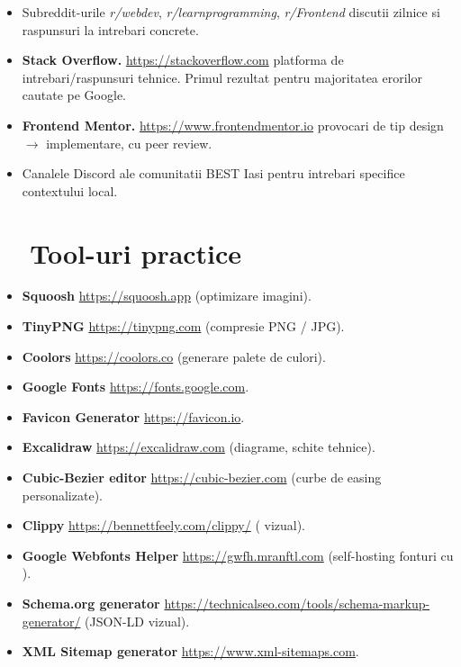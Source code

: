 \begin{itemize}[itemsep=2pt]
  \item Subreddit-urile \emph{r/webdev}, \emph{r/learnprogramming}, \emph{r/Frontend} \textendash{} discutii zilnice si raspunsuri la intrebari concrete.
  \item \textbf{Stack Overflow.} \url{https://stackoverflow.com} \textendash{} platforma de intrebari/raspunsuri tehnice. Primul rezultat pentru majoritatea erorilor cautate pe Google.
  \item \textbf{Frontend Mentor.} \url{https://www.frontendmentor.io} \textendash{} provocari de tip design $\to$ implementare, cu peer review.
  \item Canalele Discord ale comunitatii BEST Iasi \textendash{} pentru intrebari specifice contextului local.
\end{itemize}

\section{\faTools\ \ Tool-uri practice}

\begin{itemize}[itemsep=2pt]
  \item \textbf{Squoosh} \textendash{} \url{https://squoosh.app} (optimizare imagini).
  \item \textbf{TinyPNG} \textendash{} \url{https://tinypng.com} (compresie PNG / JPG).
  \item \textbf{Coolors} \textendash{} \url{https://coolors.co} (generare palete de culori).
  \item \textbf{Google Fonts} \textendash{} \url{https://fonts.google.com}.
  \item \textbf{Favicon Generator} \textendash{} \url{https://favicon.io}.
  \item \textbf{Excalidraw} \textendash{} \url{https://excalidraw.com} (diagrame, schite tehnice).
  \item \textbf{Cubic-Bezier editor} \textendash{} \url{https://cubic-bezier.com} (curbe de easing personalizate).
  \item \textbf{Clippy} \textendash{} \url{https://bennettfeely.com/clippy/} ( vizual).
  \item \textbf{Google Webfonts Helper} \textendash{} \url{https://gwfh.mranftl.com} (self-hosting fonturi cu ).
  \item \textbf{Schema.org generator} \textendash{} \url{https://technicalseo.com/tools/schema-markup-generator/} (JSON-LD vizual).
  \item \textbf{XML Sitemap generator} \textendash{} \url{https://www.xml-sitemaps.com}.
\end{itemize}

